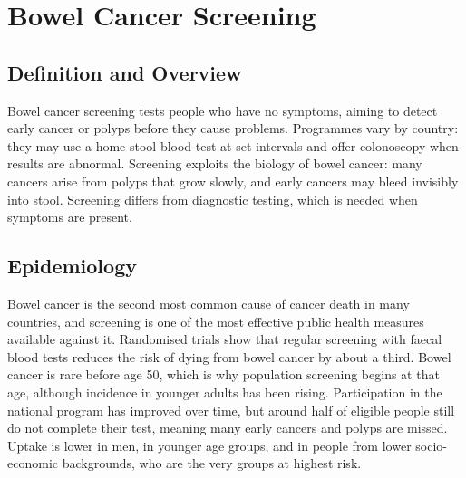 \chapter{Bowel Cancer Screening}

\section*{Definition and Overview}
Bowel cancer screening tests people who have no symptoms, aiming to detect early cancer or polyps before they cause problems. Programmes vary by country: they may use a home stool blood test at set intervals and offer colonoscopy when results are abnormal. Screening exploits the biology of bowel cancer: many cancers arise from polyps that grow slowly, and early cancers may bleed invisibly into stool. Screening differs from diagnostic testing, which is needed when symptoms are present.

\section*{Epidemiology}
Bowel cancer is the second most common cause of cancer death in many countries, and screening is one of the most effective public health measures available against it. Randomised trials show that regular screening with faecal blood tests reduces the risk of dying from bowel cancer by about a third. Bowel cancer is rare before age 50, which is why population screening begins at that age, although incidence in younger adults has been rising. Participation in the national program has improved over time, but around half of eligible people still do not complete their test, meaning many early cancers and polyps are missed. Uptake is lower in men, in younger age groups, and in people from lower socio-economic backgrounds, who are the very groups at highest risk.

